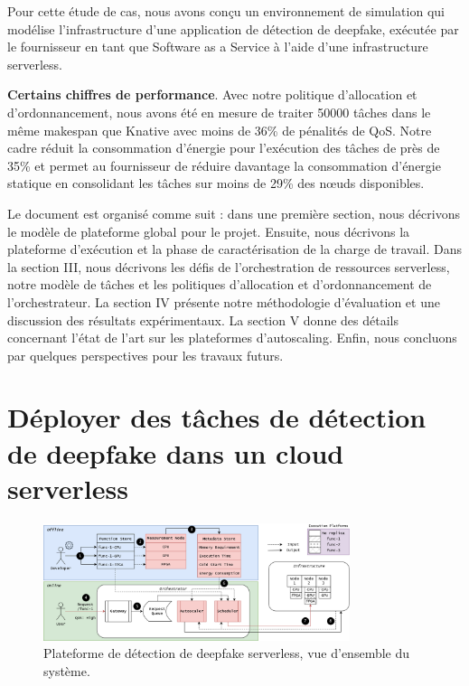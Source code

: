 Pour cette étude de cas, nous avons conçu un environnement de simulation qui modélise l'infrastructure d'une application de détection de deepfake, exécutée par le fournisseur en tant que Software as a Service à l'aide d'une infrastructure serverless.

\textbf{Certains chiffres de performance}. Avec notre politique d'allocation et d'ordonnancement, nous avons été en mesure de traiter 50000 tâches dans le même makespan que Knative avec moins de 36\% de pénalités de QoS. Notre cadre réduit la consommation d'énergie pour l'exécution des tâches de près de 35\% et permet au fournisseur de réduire davantage la consommation d'énergie statique en consolidant les tâches sur moins de 29\% des nœuds disponibles.

Le document est organisé comme suit : dans une première section, nous décrivons le modèle de plateforme global pour le projet. Ensuite, nous décrivons la plateforme d'exécution et la phase de caractérisation de la charge de travail. Dans la section III, nous décrivons les défis de l'orchestration de ressources serverless, notre modèle de tâches et les politiques d'allocation et d'ordonnancement de l'orchestrateur. La section IV présente notre méthodologie d'évaluation et une discussion des résultats expérimentaux. La section V donne des détails concernant l'état de l'art sur les plateformes d'autoscaling. Enfin, nous concluons par quelques perspectives pour les travaux futurs.

\section{Déployer des tâches de détection de deepfake dans un cloud serverless}
\label{section:herofake-deepfake}

\begin{figure}[t]
\centering
\includegraphics[width=0.8\textwidth]{4_Chapitre4/figures/placement.png}
\caption{Plateforme de détection de deepfake serverless, vue d'ensemble du système.}
\label{figure:herofake-placement}
\end{figure}

